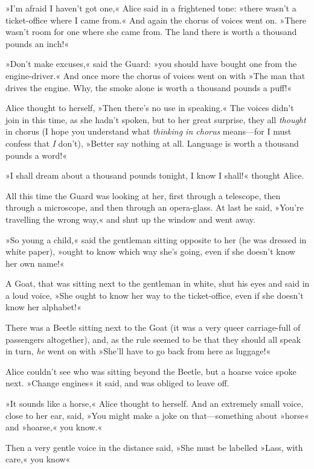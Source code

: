 »I'm afraid I haven't got one,« Alice said in a frightened tone: »there wasn't a ticket-office where I came from.« And again the chorus of voices went on. »There wasn't room for one where she came from. The land there is worth a thousand pounds an inch!«

»Don't make excuses,« said the Guard: »you should have bought one from the engine-driver.« And once more the chorus of voices went on with »The man that drives the engine. Why, the smoke alone is worth a thousand pounds a puff!«

Alice thought to herself, »Then there's no use in speaking.« The voices didn't join in this time, as she hadn't spoken, but to her great surprise, they all \textit{thought} in chorus (I hope you understand what \textit{thinking in chorus} means—for I must confess that \textit{I} don't), »Better say nothing at all. Language is worth a thousand pounds a word!«

»I shall dream about a thousand pounds tonight, I know I shall!« thought Alice.

All this time the Guard was looking at her, first through a telescope, then through a microscope, and then through an opera-glass. At last he said, »You're travelling the wrong way,« and shut up the window and went away.

»So young a child,« said the gentleman sitting opposite to her (he was dressed in white paper), »ought to know which way she's going, even if she doesn't know her own name!«

A Goat, that was sitting next to the gentleman in white, shut his eyes and said in a loud voice, »She ought to know her way to the ticket-office, even if she doesn't know her alphabet!«

There was a Beetle sitting next to the Goat (it was a very queer carriage-full of passengers altogether), and, as the rule seemed to be that they should all speak in turn, \textit{he} went on with »She'll have to go back from here as luggage!«

Alice couldn't see who was sitting beyond the Beetle, but a hoarse voice spoke next. »Change engines\longdash« it said, and was obliged to leave off.

»It sounds like a horse,« Alice thought to herself. And an extremely small voice, close to her ear, said, »You might make a joke on that—something about »horse« and »hoarse,« you know.«

Then a very gentle voice in the distance said, »She must be labelled »Lass, with care,« you know\longdash«

